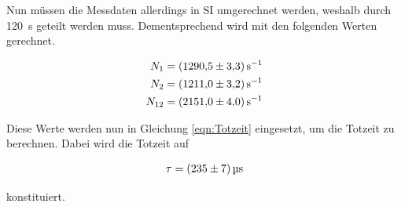 \noindent Nun müssen die Messdaten allerdings in SI umgerechnet werden, weshalb durch \qty{120}{\second} geteilt werden muss. 
Dementsprechend wird mit den folgenden Werten gerechnet.

\begin{align*}
    N_{1 } &= \qty[per-mode=reciprocal]{1290.5\pm3.3}{\per\second}    \\
    N_{2 } &= \qty[per-mode=reciprocal]{1211.0\pm3.2}{\per\second}    \\
    N_{12} &= \qty[per-mode=reciprocal]{2151.0\pm4.0}{\per\second}    \\
\end{align*}

\noindent Diese Werte werden nun in Gleichung \eqref{eqn:Totzeit} eingesetzt, um die Totzeit zu berechnen. Dabei wird die Totzeit auf

\begin{align*}
    \tau = \qty{235\pm7}{\micro \second}
\end{align*}

\noindent konstituiert.


%

